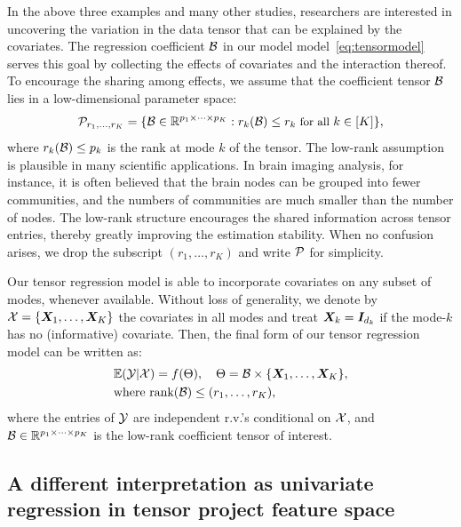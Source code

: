 \documentclass[12pt]{article}
\theoremstyle{plain}
\theoremstyle{definition}
\begin{document}
In the above three examples and many other studies, researchers are interested in uncovering the variation in the data tensor that can be explained by the covariates. The regression coefficient $\mathcal{B}$ in our model model~\eqref{eq:tensormodel} serves this goal by collecting the effects of covariates and the interaction thereof.  
To encourage the sharing among effects, we assume that the coefficient tensor $\mathcal{B}$ lies in a low-dimensional parameter space:
\begin{equation}\label{eq:rank}
\small \mathcal{P}_{r_1,\ldots,r_K}=\{\mathcal{B}\in\mathbb{R}^{p_1\times \cdots \times p_K}: r_k(\mathcal{B})\leq r_k \text{ for all } k\in[K]\},
\end{equation}
where $r_k(\mathcal{B})\leq p_k$ is the rank at mode $k$ of the tensor. The low-rank assumption is plausible in many scientific applications. In brain imaging analysis, for instance, it is often believed that the brain nodes can be grouped into fewer communities, and the numbers of communities are much smaller than the number of nodes. The low-rank structure encourages the shared information across tensor entries, thereby greatly improving the estimation stability. When no confusion arises, we drop the subscript $(r_1,\ldots,r_K)$ and write $\mathcal{P}$ for simplicity.

Our tensor regression model is able to incorporate covariates on any subset of modes, whenever available. Without loss of generality, we denote by $\mathcal{X}=\{\bm X_1,\ldots,\bm X_K\}$ the covariates in all modes and treat $\bm X_k=\bm I_{d_k}$ if the mode-$k$ has no (informative) covariate. Then, the final form of our tensor regression model can be written as:
\begin{align}\label{eq:tensormodel2}
&\mathbb{E}(\mathcal{Y}|\mathcal{X})=f(\Theta),\quad \Theta =\mathcal{B}\times\{\bm X_1,\ldots,\bm X_K\},\notag\\
&\text{where}\ \text{rank}(\mathcal{B})\leq (r_1,\ldots,r_K),
\end{align}
where the entries of $\mathcal{Y}$ are independent r.v.'s conditional on $\mathcal{X}$, and $\mathcal{B}\in\mathbb{R}^{p_1\times \cdots\times p_K}$ is the low-rank coefficient tensor of interest. 


\subsection{A different interpretation as univariate regression in tensor project feature space}
\end{document}
